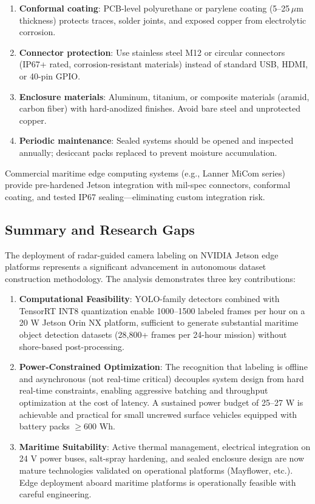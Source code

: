 \begin{enumerate}
  \item \textbf{Conformal coating}: PCB-level polyurethane or parylene coating (5--25\,$\mu$m thickness) protects traces, solder joints, and exposed copper from electrolytic corrosion.
  \item \textbf{Connector protection}: Use stainless steel M12 or circular connectors (IP67+ rated, corrosion-resistant materials) instead of standard USB, HDMI, or 40-pin GPIO.
  \item \textbf{Enclosure materials}: Aluminum, titanium, or composite materials (aramid, carbon fiber) with hard-anodized finishes. Avoid bare steel and unprotected copper.
  \item \textbf{Periodic maintenance}: Sealed systems should be opened and inspected annually; desiccant packs replaced to prevent moisture accumulation.
\end{enumerate}

Commercial maritime edge computing systems (e.g., Lanner MiCom series) \cite{Noel2024LannerMaritime} provide pre-hardened Jetson integration with mil-spec connectors, conformal coating, and tested IP67 sealing---eliminating custom integration risk.

\subsection{Summary and Research Gaps}

The deployment of radar-guided camera labeling on NVIDIA Jetson edge platforms represents a significant advancement in autonomous dataset construction methodology. The analysis demonstrates three key contributions:

\begin{enumerate}
  \item \textbf{Computational Feasibility}: YOLO-family detectors combined with TensorRT INT8 quantization enable 1000--1500 labeled frames per hour on a 20 W Jetson Orin NX platform, sufficient to generate substantial maritime object detection datasets (28,800+ frames per 24-hour mission) without shore-based post-processing.

  \item \textbf{Power-Constrained Optimization}: The recognition that labeling is offline and asynchronous (not real-time critical) decouples system design from hard real-time constraints, enabling aggressive batching and throughput optimization at the cost of latency. A sustained power budget of 25--27 W is achievable and practical for small uncrewed surface vehicles equipped with battery packs $\geq 600$ Wh.

  \item \textbf{Maritime Suitability}: Active thermal management, electrical integration on 24 V power buses, salt-spray hardening, and sealed enclosure design are now mature technologies validated on operational platforms (Mayflower, etc.). Edge deployment aboard maritime platforms is operationally feasible with careful engineering.
\end{enumerate}

